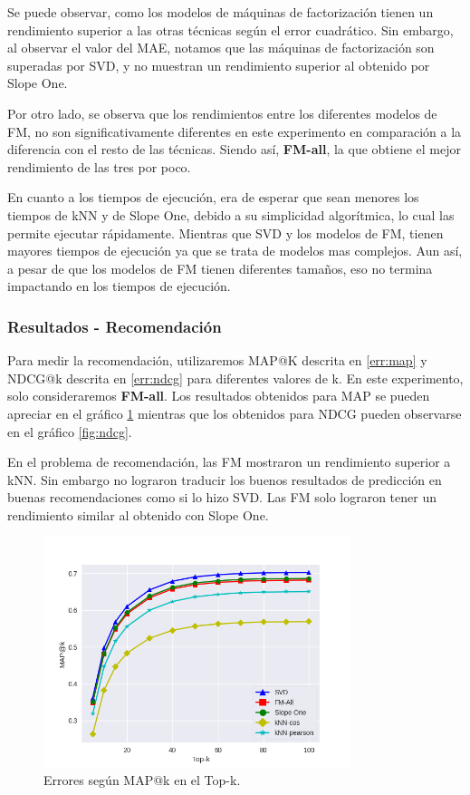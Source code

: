 \documentclass[hidelinks,12pt,a4paper]{book}
\theoremstyle{plain}
\theoremstyle{definition}
\begin{document}
Se puede observar, como los modelos de máquinas de factorización tienen un rendimiento superior a las otras técnicas según el error cuadrático. Sin embargo, al observar el valor del MAE, notamos que las máquinas de factorización son superadas por SVD, y no muestran un rendimiento superior al obtenido por Slope One.

Por otro lado, se observa que los rendimientos entre los diferentes modelos de FM, no son significativamente diferentes en este experimento en comparación a la diferencia con el resto de las técnicas. Siendo así, \textbf{FM-all}, la que obtiene el mejor rendimiento de las tres por poco.

En cuanto a los tiempos de ejecución, era de esperar que sean menores los tiempos de kNN y de Slope One, debido a su simplicidad algorítmica, lo cual las permite ejecutar rápidamente. Mientras que SVD y los modelos de FM, tienen mayores tiempos de ejecución ya que se trata de modelos mas complejos. Aun así, a pesar de que los modelos de FM tienen diferentes tamaños, eso no termina impactando en los tiempos de ejecución.

\subsubsection{Resultados - Recomendación}

Para medir la recomendación, utilizaremos MAP@K descrita en \eqref{err:map} y NDCG@k descrita en \eqref{err:ndcg} para diferentes valores de k. En este experimento, solo consideraremos \textbf{FM-all}. Los resultados obtenidos para MAP se pueden apreciar en el gráfico \ref{fig:map} mientras que los obtenidos para NDCG pueden observarse en el gráfico \ref{fig:ndcg}.

En el problema de recomendación, las FM mostraron un rendimiento superior a kNN. Sin embargo no lograron traducir los buenos resultados de predicción en buenas recomendaciones como si lo hizo SVD. Las FM solo lograron tener un rendimiento similar al obtenido con Slope One.

\begin{figure}[!ht]
\centering
\includegraphics[width=0.8\textwidth]{graficos/map1.png}
\caption{Errores según MAP@k en el Top-k.}\label{fig:map}
\end{figure}
\end{document}
